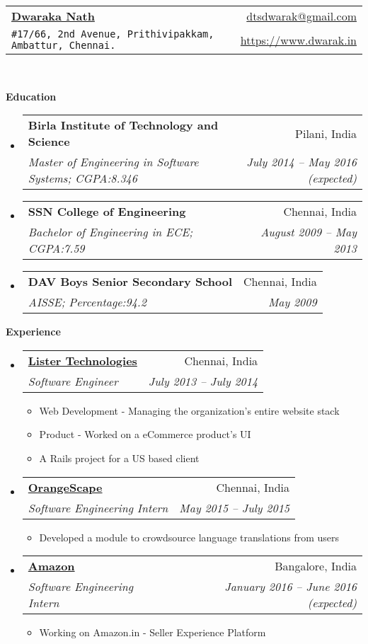 \documentclass[letterpaper,11pt]{article}
\makeatletter
\newcommand{\resitem}[1]{\item #1 \vspace{-2pt}}
\newcommand{\resheading}[1]{{\large \colorbox{mygrey}{\begin{minipage}{\textwidth}{\textbf{#1 \vphantom{p\^{E}}}}\end{minipage}}}}
\newcommand{\ressubheading}[4]{
\begin{tabular*}{6.5in}{l@{\extracolsep{\fill}}r}
		\textbf{#1} & #2 \\
		\textit{#3} & \textit{#4} \\
\end{tabular*}\vspace{-6pt}}
\makeatother
\begin{document}
\newcommand{\mywebheader}{
\begin{tabular*}{7in}{l@{\extracolsep{\fill}}r}
	\textbf{\href{https://www.dwarak.in/}{\LARGE Dwaraka Nath}} & \href{mailto:dtsdwarak@gmail.com}{dtsdwarak@gmail.com}\\
	{\footnotesize \texttt{\#17/66, 2nd Avenue, Prithivipakkam, Ambattur, Chennai.}} & \href{https://www.dwarak.in}{https://www.dwarak.in} \\
	\end{tabular*}
\\
\vspace{0.1in}}

\mywebheader

\resheading{Education}
	\begin{itemize}
		\item
			\ressubheading{{Birla Institute of Technology and Science}}{Pilani, India}{{Master of Engineering in Software Systems};{ CGPA:8.346}}{July 2014 -- May 2016 (expected)}
		\item
			\ressubheading{{SSN College of Engineering}}{Chennai, India}{{Bachelor of Engineering in ECE};{ CGPA:7.59}}{August 2009 -- May 2013}
		\item
			\ressubheading{{DAV Boys Senior Secondary School}}{Chennai, India}{{AISSE};{ Percentage:94.2}}{May 2009}			
	\end{itemize} %


\resheading{Experience}
	\begin{itemize}
		\item 
			\ressubheading{\href{http://www.listertechnologies.com/}{Lister Technologies}}{Chennai, India}
				{Software Engineer}{July 2013 -- July 2014}
				{ \footnotesize
				\begin{itemize}
					\resitem{Web Development - Managing the organization's entire website stack}
					\resitem{Product - Worked on a eCommerce product's UI}
					\resitem{A Rails project for a US based client}
				\end{itemize}
				}
        \item 
			\ressubheading{\href{http://www.orangescape.com/}{OrangeScape}}{Chennai, India}
				{Software Engineering Intern}{May 2015 -- July 2015}
				{ \footnotesize
				\begin{itemize}
					\resitem{Developed a module to crowdsource language translations from users}
				\end{itemize}
				}
		\item 
			\ressubheading{\href{http://www.amazon.in/}{Amazon}}{Bangalore, India}
				{Software Engineering Intern}{January 2016 -- June 2016 (expected)}
				{ \footnotesize
				\begin{itemize}
					\resitem{Working on Amazon.in  - Seller Experience Platform}
				\end{itemize}
				}
	\end{itemize}  %
\end{document}
